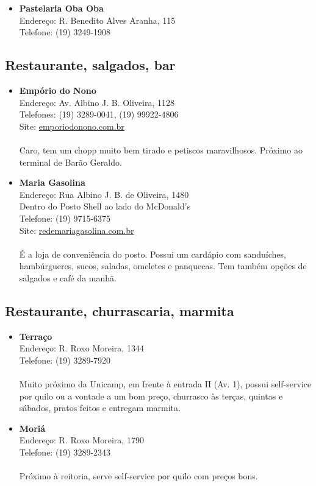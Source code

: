 \begin{itemize}
\item \textbf{Pastelaria Oba Oba}
  \\Endereço: R. Benedito Alves Aranha, 115
  \\Telefone: (19) 3249-1908
\end{itemize}

\subsection{Restaurante, salgados, bar}

\begin{itemize}
\item \textbf{Empório do Nono}
  \\Endereço: Av. Albino J. B. Oliveira, 1128
  \\Telefones: (19) 3289-0041, (19) 99922-4806
  \\Site: \url{emporiodonono.com.br}
  \\
  \\Caro, tem um chopp muito bem tirado e petiscos maravilhosos. Próximo ao
  terminal de Barão Geraldo.

\item \textbf{Maria Gasolina}
  \\Endereço: Rua Albino J. B. de Oliveira, 1480
  \\Dentro do Posto Shell ao lado do McDonald's
  \\Telefone: (19) 9715-6375
  \\Site: \url{redemariagasolina.com.br}
  \\
  \\É a loja de conveniência do posto. Possui um cardápio com sanduíches,
  hambúrgueres, sucos, saladas, omeletes e panquecas. Tem também opções de
  salgados e café da manhã.
\end{itemize}

\subsection{Restaurante, churrascaria, marmita}

\begin{itemize}
\item \textbf{Terraço}
  \\Endereço: R. Roxo Moreira, 1344
  \\Telefone: (19) 3289-7920
  \\
  \\Muito próximo da Unicamp, em frente à entrada II (Av. 1), possui
  self-service por quilo ou a vontade a um bom preço, churrasco às terças,
  quintas e sábados, pratos feitos e entregam marmita.

\item \textbf{Moriá}
  \\Endereço: R. Roxo Moreira, 1790
  \\Telefone: (19) 3289-2343
  \\
  \\Próximo à reitoria, serve self-service por quilo com preços bons.
\end{itemize}

